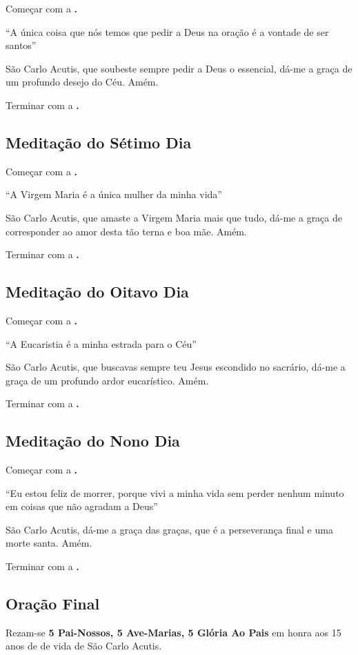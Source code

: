 \documentclass[a4paper,14pt]{extarticle} \usepackage[utf8]{inputenc}
\begin{document}
Começar com a \textbf{.}

“A única coisa que nós temos que pedir a Deus na oração é a vontade de ser santos”

São Carlo Acutis, que soubeste sempre pedir a Deus o essencial, dá-me a graça de um profundo desejo do Céu. Amém.

Terminar com a \textbf{.}

\subsection{Meditação do Sétimo Dia}

Começar com a \textbf{.}

“A Virgem Maria é a única mulher da minha vida”

São Carlo Acutis, que amaste a Virgem Maria mais que tudo, dá-me a graça de corresponder ao amor desta tão terna e boa mãe. Amém.

Terminar com a \textbf{.}

\subsection{Meditação do Oitavo Dia}

Começar com a \textbf{.}

“A Eucaristia é a minha estrada para o Céu”

São Carlo Acutis, que buscavas sempre teu Jesus escondido no sacrário, dá-me a graça de um profundo ardor eucarístico. Amém.

Terminar com a \textbf{.}

\subsection{Meditação do Nono Dia}

Começar com a \textbf{.}

“Eu estou feliz de morrer, porque vivi a minha vida sem perder nenhum minuto em coisas que não agradam a Deus”

São Carlo Acutis, dá-me a graça das graças, que é a perseverança final e uma morte santa. Amém.

Terminar com a \textbf{.}


\subsection{Oração Final} \label{oracao-final}
\begin{center}
Rezam-se \textbf{5 Pai-Nossos, 5 Ave-Marias, 5 Glória Ao Pais} em honra aos 15 anos de de vida de São Carlo Acutis. 
\end{center}
\end{document}

